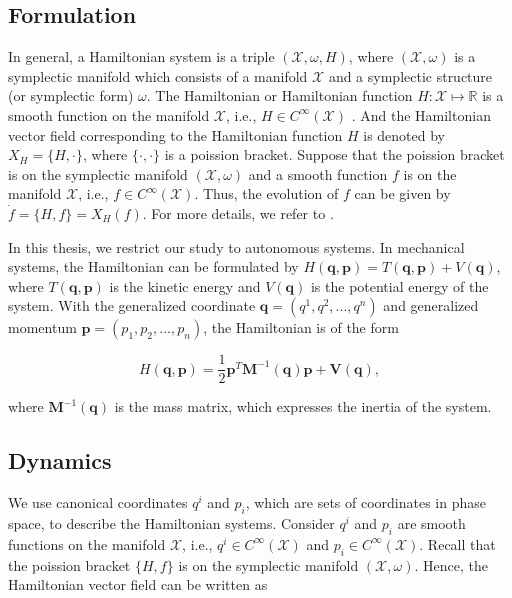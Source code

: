 \documentclass[
	parskip, 			   %
	twoside, 			   %
	DIV=14, 			   %
	BCOR=15.0mm, 		   %
	headsepline, 		   %
	open=right, 		   %
	captions=tableheading, %
	bibliography=totoc,    %
	numbers=noenddot       %
]{scrreprt}
\begin{document}
\subsection{Formulation}
In general, a Hamiltonian system is a triple $(\mathcal{X},\omega,H)$, where $(\mathcal{X},\omega)$ is a symplectic manifold which consists of a manifold $\mathcal{X}$ and a symplectic structure (or symplectic form) $\omega$. The Hamiltonian or Hamiltonian function $H: \mathcal{X} \mapsto \mathbb{R} $ is a smooth function on the manifold $\mathcal{X}$, i.e., $H \in C^{\infty}(\mathcal{X})$ \cite{rudolph2017differential}. And the Hamiltonian vector field corresponding to the Hamiltonian function $H$ is denoted by $X_H = \{H, \cdot \}$, where $\{\cdot, \cdot\}$ is a poission bracket. Suppose that the poission bracket is on the symplectic manifold $(\mathcal{X},\omega)$ and a smooth function $f$ is on the manifold $\mathcal{X}$, i.e., $f \in C^{\infty}(\mathcal{X}) $. Thus, the evolution of $f$ can be given by $\dot{f} = \{H, f\} = X_H(f)$. For more details, we refer to \cite{rudolph2012differential}.

In this thesis, we restrict our study to autonomous systems. In mechanical systems, the Hamiltonian can be formulated by $H(\mathbf{q},\mathbf{p})=T(\mathbf{q},\mathbf{p})+V(\mathbf{q})$, where $T(\mathbf{q},\mathbf{p})$ is the kinetic energy and $V(\mathbf{q})$ is the potential energy of the system. With the generalized coordinate $\mathbf{q} = (q^1, q^2, ..., q^n)$ and generalized momentum $\mathbf{p} = (p_1, p_2, ..., p_n)$, the Hamiltonian is of the form

\begin{equation}
    \label{eq:Hamiltonian}
    H(\mathbf{q},\mathbf{p})=\frac{1}{2}\mathbf{p}^T\mathbf{M}^{-1}(\mathbf{q})\mathbf{p} + \mathbf{V}(\mathbf{q}),
\end{equation}

where $\mathbf{M}^{-1}(\mathbf{q})$ is the mass matrix, which expresses the inertia of the system.

\subsection{Dynamics}
We use canonical coordinates $q^i$ and $p_i$, which are sets of coordinates in phase space, to describe the Hamiltonian systems. Consider $q^i$ and $p_i$ are smooth functions on the manifold $\mathcal{X}$, i.e., $q^i \in C^{\infty}(\mathcal{X})$ and $p_i \in C^{\infty}(\mathcal{X})$. Recall that the poission bracket $\{H, f\}$ is on the symplectic manifold $(\mathcal{X},\omega)$. Hence, the Hamiltonian vector field can be written as 
\end{document}
